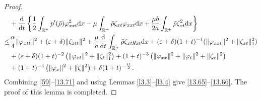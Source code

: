 \documentclass[11pt]{article}
\theoremstyle{plain}
\numberwithin{equation}{section}
\begin{document}
\begin{proof}
\begin{align}
			&+\frac{{\rm d}}{{\rm d}t}\left\{\frac{1}{2}\int_{\mathbb{R}^+}p^{\prime}(\bar\rho)\varphi_{xxt}^2{\rm d}x-\mu\int_{\mathbb{R}^+}\bar\rho\zeta_{xt} \varphi_{xxt}{\rm d}x+\frac{\mu b}{2a}\int_{\mathbb{R}^+}^{}\bar\rho\zeta_{xt}^2{\rm d}x\right\}\notag\\
			\leq&\frac{\alpha}{4}\|\varphi_{xtt}\|^2+(\varepsilon+\delta)\|\zeta_{xtt}\|^2+\frac{\mu}{a}\frac{{\rm d}}{{\rm d}t}\int_{\mathbb{R}^+}\bar\rho\zeta_{xt} g_{xt}{\rm d}x+(\varepsilon+\delta)(1+t)^{-1}(\|\varphi_{xxt}\|^2+\|\zeta_{xt}\|_1^2)\notag\\ 
			&+(\varepsilon+\delta)(1+t)^{-2}\left(\|\varphi_{xt}\|^2+\|\zeta_t\|_1^2\right)+(1+t)^{-3}\left(\|\varphi_{xx}\|^2+\|\varphi_t\|^2+\|\zeta_x\|^2\right)\notag\\ 
			&+(1+t)^{-4}\left(\|\varphi_x\|^2+\|\zeta\|^2\right)+\delta (1+t)^{-\frac{11}{2}}.
		\end{align}
Combining \eqref{59}--\eqref{13.71} and using Lemmas \ref{l3.3}--\ref{l3.4} give \eqref{13.65}--\eqref{13.66}. The proof of this lemma is completed.
	\end{proof}
\end{document}
